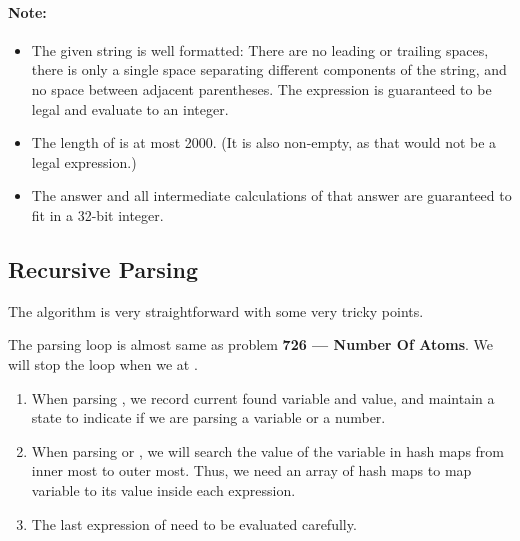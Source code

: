 \paragraph{Note:}

\begin{itemize}
\item The given string  is well formatted: There are no leading or trailing spaces, there is only a single space separating different components of the string, and no space between adjacent parentheses. The expression is guaranteed to be legal and evaluate to an integer.
\item The length of  is at most 2000. (It is also non-empty, as that would not be a legal expression.)
\item The answer and all intermediate calculations of that answer are guaranteed to fit in a 32-bit integer.
\end{itemize}

\subsection{Recursive Parsing}
The algorithm is very straightforward with some very tricky points.

The parsing loop is almost same as problem \textbf{726 --- Number Of Atoms}. We will stop the loop when we at .

\begin{enumerate}
\item When parsing , we record current found variable and value, and maintain a state to indicate if we are parsing a variable or a number.
\item When parsing  or , we will search the value of the variable in hash maps from inner most to outer most. Thus, we need an array of hash maps to map variable to its value inside each expression.
\item The last expression of  need to be evaluated carefully.
\end{enumerate}

